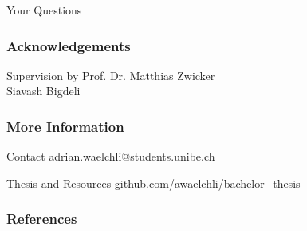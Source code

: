 \documentclass[12pt, compress]{beamer}
\begin{document}
\begin{frame}
	\begin{center}
		\LARGE Your Questions
	\end{center}
\end{frame}

\begin{frame}
	\frametitle{Acknowledgements}
	
	\begin{block}{Supervision by}
		Prof. Dr. Matthias Zwicker \\
		Siavash Bigdeli
	\end{block}
\end{frame}

\begin{frame}[fragile]
	\frametitle{More Information}
	
	\begin{block}{Contact}
  		adrian.waelchli@students.unibe.ch
	\end{block}
	
	\begin{block}{Thesis and Resources}
		\href{https://github.com/awaelchli/bachelor_thesis}{github.com/awaelchli/bachelor\_thesis}
	\end{block}
\end{frame}

\begin{frame}
	\frametitle{References}
	
	
%	
	\def\bibfont{\scriptsize}
	
\end{frame}
\end{document}
